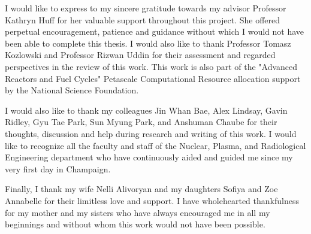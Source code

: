 I would like to express to my sincere gratitude towards my advisor Professor Kathryn Huff
for her valuable support throughout this project. She offered perpetual encouragement, patience and guidance
without which I would not have been able to complete this thesis. I would also like to thank Professor Tomasz Kozlowski and Professor Rizwan Uddin for their assessment and regarded perspectives in the review of this work. This work is also part of the "Advanced Reactors and Fuel Cycles" Petascale Computational Resource allocation support by the National Science Foundation.

I would also like to thank my colleagues Jin Whan Bae, Alex Lindsay, Gavin Ridley, Gyu Tae Park, Sun Myung Park, and Anshuman Chaube for their thoughts, discussion and help during research and writing of this work. I would like to recognize all the faculty and staff of the Nuclear, Plasma, and Radiological Engineering department who have continuously aided and guided me since my very first day in Champaign. 

Finally, I thank my wife Nelli Alivoryan and my daughters Sofiya and Zoe Annabelle for their limitless love and support. I have wholehearted thankfulness for my mother and my sisters who have always encouraged me in all my beginnings and without whom this work would not have been possible. 

